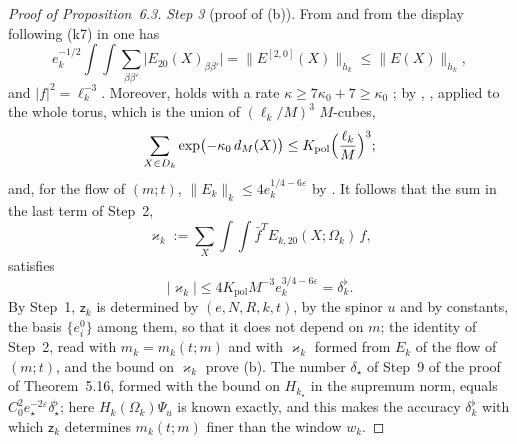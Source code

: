 \documentclass[11pt,letterpaper,reqno]{amsart}
\theoremstyle{definition}
\begin{document}
\begin{proof}[Proof of Proposition~6.3]
\emph{Step 3} (proof of (b)).
From \cite[Section~I.5.1, paragraphs ``The norms of the scheme'' and ``Matrix notation'']{QEDIII} and from the display following (k7) in \cite[Section~I.5.4]{QEDIII} one has
\begin{equation*}
e_k^{-1/2}\int\!\!\int\sum_{\beta\beta'}\bigl|E_{20}(X)_{\beta\beta'}\bigr|=\bigl\|E^{[2,0]}(X)\bigr\|_{h_k}\le\|E(X)\|_{h_k},
\end{equation*}
and $|f|^2=\ell_k^{-3}$.
Moreover, \cite[(k6)]{QEDIII} holds with a rate $\kappa\ge7\kappa_0+7\ge\kappa_0$ \cite[Section~I.8.2, line~(C2)]{QEDIII};
by \cite[Proposition~5.58\,(t2)]{QEDI}, \cite[Chapter~24, Section~0.6, (t2)]{QEDIII}, applied to the whole torus, which is the union of $(\ell_k/M)^3$ $M$-cubes,
\begin{equation*}
\sum_{X\in D_k}\exp\bigl(-\kappa_0\,d_M(X)\bigr)\le K_{\mathrm{pol}}\Bigl(\frac{\ell_k}M\Bigr)^3 ;
\end{equation*}
and, for the flow of $(m;t)$, $\|E_k\|_k\le4e_k^{1/4-6\varepsilon}$ by \cite[Proposition~28.1]{QEDIII}.
It follows that the sum in the last term of Step~2,
\begin{equation*}
\varkappa_k:=\sum_X\int\!\!\int\bar f^{T}E_{k,20}(X;\Omega_k)\,f,
\end{equation*}
satisfies
\begin{equation*}
|\varkappa_k|\le4K_{\mathrm{pol}}M^{-3}e_k^{3/4-6\varepsilon}=\delta^\flat_k .
\end{equation*}
By Step~1, $\mathsf z_k$ is determined by $(e,N,R,k,t)$, by the spinor $u$ and by constants, the basis $\{e_i^0\}$ among them, so that it does not depend on $m$;
the identity of Step~2, read with $m_k=m_k(t;m)$ and with $\varkappa_k$ formed from $E_k$ of the flow of $(m;t)$, and the bound on $\varkappa_k$ prove (b).
The number $\delta_\star$ of Step~9 of the proof of Theorem~5.16, formed with the bound on $H_{k_\star}$ in the supremum norm, equals $C_0^2e_\star^{-2\varepsilon}\delta^\flat_\star$;
here $H_k(\Omega_k)\Psi_u$ is known exactly, and this makes the accuracy $\delta^\flat_k$ with which $\mathsf z_k$ determines $m_k(t;m)$ finer than the window $w_k$.


\end{proof}
\end{document}
